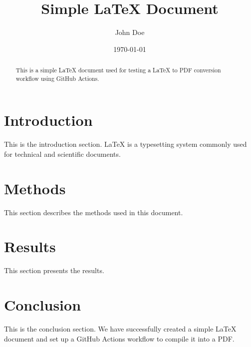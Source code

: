 \documentclass[11pt]{article}
\title{Simple LaTeX Document}
\author{John Doe}
\date{\today}
\begin{document}
\maketitle

\begin{abstract}
This is a simple LaTeX document used for testing a LaTeX to PDF conversion workflow using GitHub Actions.
\end{abstract}

\section{Introduction}
This is the introduction section. LaTeX is a typesetting system commonly used for technical and scientific documents.

\section{Methods}
This section describes the methods used in this document.

\section{Results}
This section presents the results.

\section{Conclusion}
This is the conclusion section. We have successfully created a simple LaTeX document and set up a GitHub Actions workflow to compile it into a PDF.
\end{document}
